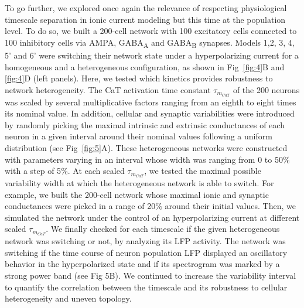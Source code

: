 To go further, we explored once again  the relevance of respecting physiological timescale separation in ionic current modeling but this time at the population level. To do so, we built a 200-cell network with 100 excitatory cells connected to 100 inhibitory cells via AMPA, GABA\textsubscript{A} and GABA\textsubscript{B} synapses.  Models 1,2, 3, 4, 5' and 6' were switching their network state under a hyperpolarizing current for a homogeneous and a heterogeneous configuration, as shown in Fig~\ref{fig:4}B and \ref{fig:4}D (left panels).  Here, we tested which kinetics provides robustness to network heterogeneity. The CaT activation time constant $\tau_{m_{CaT}}$ of the 200 neurons was scaled by several multiplicative factors ranging from an eighth to eight times its nominal value. In addition, cellular and synaptic variabilities were introduced by randomly picking the maximal intrinsic and extrinsic conductances of each neuron in a given interval around their nominal values following a uniform distribution (see Fig~\ref{fig:5}A).  These heterogeneous networks were constructed with parameters varying in an interval whose width was ranging from 0 to 50$\%$ with a step of 5$\%$. At each scaled $\tau_{m_{CaT}}$, we tested the maximal possible variability width at which the heterogeneous network is able to switch.  For example, we built the 200-cell network whose maximal ionic and synaptic conductances were picked in a range of 20$\%$ around their initial values. Then, we simulated the network under the control of an hyperpolarizing current at different scaled $\tau_{m_{CaT}}$. We finally checked for each timescale if the given heterogeneous network was switching or not, by analyzing its LFP activity. The network was switching if the time course of neuron population LFP displayed an oscillatory behavior in the hyperpolarized state and if its spectrogram was marked by a strong power band (see Fig 5B). We continued to increase the variability interval to quantify the correlation between the timescale and its robustness to cellular heterogeneity and uneven topology.

